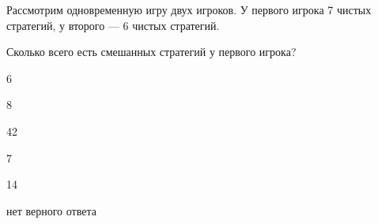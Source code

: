 
\begin{question}
Рассмотрим одновременную игру двух игроков. У первого игрока 7 чистых
стратегий, у второго --- 6 чистых стратегий.

Сколько всего есть смешанных стратегий у первого игрока?
\begin{answerlist}
  \item 6
  \item 8
  \item 42
  \item 7
  \item 14
  \item нет верного ответа
\end{answerlist}
\end{question}


